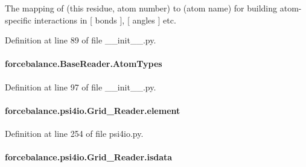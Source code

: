 The mapping of (this residue, atom number) to (atom name) for building atom-\/specific interactions in \mbox{[} bonds \mbox{]}, \mbox{[} angles \mbox{]} etc. 



Definition at line 89 of file \-\_\-\-\_\-init\-\_\-\-\_\-.\-py.

\hypertarget{classforcebalance_1_1BaseReader_a69ca7d949a4a3df4d9f61e617fe0e270}{
\paragraph[{Atom\-Types}]{\setlength{\rightskip}{0pt plus 5cm}forcebalance.\-Base\-Reader.\-Atom\-Types\hspace{0.3cm}{\ttfamily [inherited]}}}\label{classforcebalance_1_1BaseReader_a69ca7d949a4a3df4d9f61e617fe0e270}


Definition at line 97 of file \-\_\-\-\_\-init\-\_\-\-\_\-.\-py.

\hypertarget{classforcebalance_1_1psi4io_1_1Grid__Reader_aef1fb2c7e576834299a1f926f83061b5}{
\paragraph[{element}]{\setlength{\rightskip}{0pt plus 5cm}forcebalance.\-psi4io.\-Grid\-\_\-\-Reader.\-element}}\label{classforcebalance_1_1psi4io_1_1Grid__Reader_aef1fb2c7e576834299a1f926f83061b5}


Definition at line 254 of file psi4io.\-py.

\hypertarget{classforcebalance_1_1psi4io_1_1Grid__Reader_a1134ad300de317ee30aa333d24978cc0}{
\paragraph[{isdata}]{\setlength{\rightskip}{0pt plus 5cm}forcebalance.\-psi4io.\-Grid\-\_\-\-Reader.\-isdata}}\label{classforcebalance_1_1psi4io_1_1Grid__Reader_a1134ad300de317ee30aa333d24978cc0}


